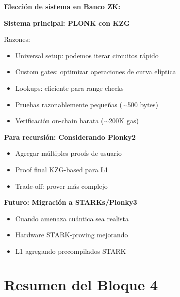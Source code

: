 \documentclass[11pt,a4paper,twoside,openright]{book}
\theoremstyle{definition}
\theoremstyle{plain}
\theoremstyle{remark}
\begin{document}
\begin{bancozk}
\textbf{Elección de sistema en Banco ZK:}

\textbf{Sistema principal: PLONK con KZG}

Razones:
\begin{itemize}
    \item Universal setup: podemos iterar circuitos rápido
    \item Custom gates: optimizar operaciones de curva elíptica
    \item Lookups: eficiente para range checks
    \item Pruebas razonablemente pequeñas ($\sim$500 bytes)
    \item Verificación on-chain barata ($\sim$200K gas)
\end{itemize}

\textbf{Para recursión: Considerando Plonky2}
\begin{itemize}
    \item Agregar múltiples proofs de usuario
    \item Proof final KZG-based para L1
    \item Trade-off: prover más complejo
\end{itemize}

\textbf{Futuro: Migración a STARKs/Plonky3}
\begin{itemize}
    \item Cuando amenaza cuántica sea realista
    \item Hardware STARK-proving mejorando
    \item L1 agregando precompilados STARK
\end{itemize}
\end{bancozk}

\section{Resumen del Bloque 4}
\end{document}
